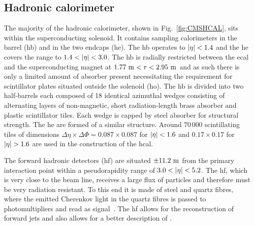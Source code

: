 \subsection{Hadronic calorimeter}
\label{ssec:HCAL}
The majority of the hadronic calorimeter, shown in Fig.~\ref{fig:CMSHCAL}, sits within the superconducting solenoid. 
It contains sampling calorimeters in the barrel (\acrshort{hb}) and in the two endcaps (\acrshort{he}). 
The \acrshort{hb} operates to $\lvert \eta \rvert<1.4$ and the \acrshort{he} covers the range to $1.4<\lvert \eta \rvert<3.0$.
The \acrshort{hb} is radially restricted between the \acrshort{ecal} and the superconducting magnet at $1.77\mathrm{~m}^{} < r < 2.95\mathrm{~m}^{}$ and as such there is only a limited amount of absorber present necessitating the requirement for scintillator plates situated outside the solenoid (\acrshort{ho}).
The \acrshort{hb} is divided into two half-barrels each composed of 18 identical azimuthal wedges consisting of alternating layers of non-magnetic, short radiation-length brass absorber and plastic scintillator tiles.
Each wedge is capped by steel absorber for structural strength.
The \acrshort{he} are formed of a similar structure.
Around $70\,000$ scintillating tiles of dimensions $\Delta\eta\times\Delta\Phi=0.087\times0.087$ for $\lvert \eta \rvert<1.6$ and $0.17\times0.17$ for $\lvert \eta \rvert>1.6$ are used in the construction of the \acrshort{hcal}.

The forward hadronic detectors (\acrshort{hf}) are situated $\pm11.2\mathrm{~m}^{}$ from the primary interaction point within a pseudorapidity range of $3.0<\lvert \eta \rvert<5.2$.
The \acrshort{hf}, which is very close to the beam line, receives a large flux of particles and therefore must be very radiation resistant.
To this end it is made of steel and quartz fibres, where the emitted Cherenkov light in the quartz fibres is passed to photomultipliers and read as signal~\cite{HF}.
The \acrshort{hf} allows for the reconstruction of forward jets and also allows for a better description of \ptmiss{}.

